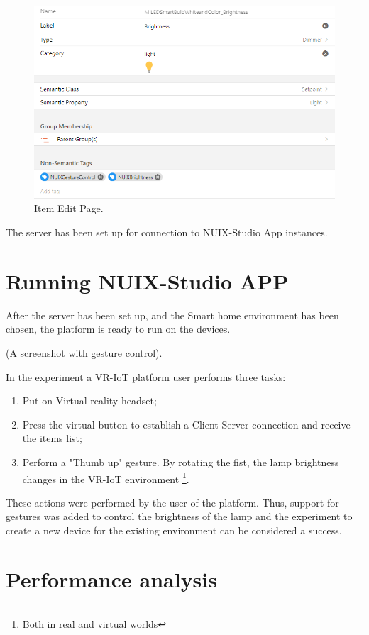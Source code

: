 \begin{figure}
  \centering
  \includegraphics[width = 0.9 \linewidth]{figures/ItemEditPage.png}
  \caption{Item Edit Page.}
  \label{fig:ItemEditPage-figure}
\end{figure}

The server has been set up for connection to NUIX-Studio App instances.

\section{Running NUIX-Studio APP}

After the server has been set up, and the Smart home environment has been chosen, the platform is ready to run on the devices.

(A screenshot with gesture control).

In the experiment a VR-IoT platform user performs three tasks:
\begin{enumerate}
    \item Put on Virtual reality headset;
    \item Press the virtual button to establish a Client-Server connection and receive the items list;
    \item Perform a "Thumb up" gesture. By rotating the fist, the lamp brightness changes in the VR-IoT environment \footnote{Both in real and virtual worlds}.
\end{enumerate}

These actions were performed by the user of the platform. Thus, support for gestures was added to control the brightness of the lamp and the experiment to create a new device for the existing environment can be considered a success.

\section{Performance analysis}

